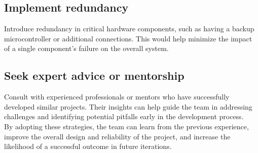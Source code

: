 \documentclass{article}
\begin{document}
\subsection{Implement redundancy}
Introduce redundancy in critical hardware components, such as having a backup microcontroller or additional connections. This would help minimize the impact of a single component's failure on the overall system.

\subsection{Seek expert advice or mentorship}
Consult with experienced professionals or mentors who have successfully developed similar projects. Their insights can help guide the team in addressing challenges and identifying potential pitfalls early in the development process. \\ 

By adopting these strategies, the team can learn from the previous experience, improve the overall design and reliability of the project, and increase the likelihood of a successful outcome in future iterations.
\end{document}
